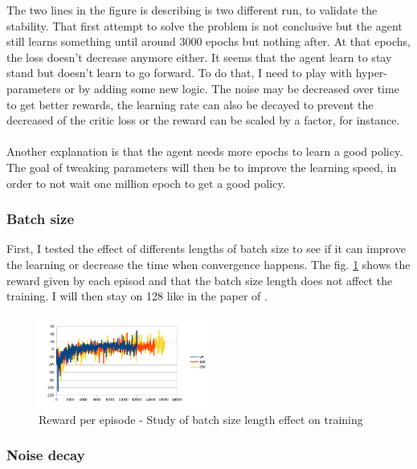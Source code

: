 \documentclass{article}
\begin{document}
The two lines in the figure is describing is two different run, to validate the stability.
That first attempt to solve the problem is not conclusive but the agent still
learns something until around 3000 epochs but nothing after. At that epochs, the
loss doesn't decrease anymore either. It seems that the agent learn to stay
stand but doesn't learn to go forward. To do that, I need to play with
hyper-parameters or by adding some new logic. The noise may be decreased over
time to get better rewards, the learning rate can also be decayed to prevent the
decreased of the critic loss or the reward can be scaled by a factor, for
instance.

\paragraph{}
Another explanation is that the agent needs more epochs to learn a good policy.
The goal of tweaking parameters will then be to improve the learning speed, in
order to not wait one million epoch to get a good policy.

\subsubsection{Batch size}

First, I tested the effect of differents lengths of batch size to see if it can
improve the learning or decrease the time when convergence happens. The fig.
\ref{fig:study_bs} shows the reward given by each episod and that the batch size
length does not affect the training. I will then stay on 128 like in the paper of
\citeauthor{journals/corr/LillicrapHPHETS15}.

\begin{figure}[ht]
  \centering
  \includegraphics[width=0.5\textwidth]{study_batch_size}
  \caption{Reward per episode - Study of batch size length effect on training}
  \label{fig:study_bs}
\end{figure}

\subsubsection{Noise decay}
\end{document}
